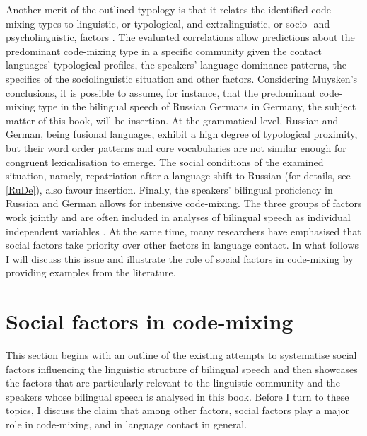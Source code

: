 Another merit of the outlined typology is that it relates the identified code-mixing types to linguistic, or typological, and extralinguistic, or socio- and psycholinguistic, factors \citep[][221--249]{muysken-bilingual-2000}. The evaluated correlations allow predictions about the predominant code-mixing type in a specific community given the contact languages' typological profiles, the speakers' language dominance patterns, the specifics of the sociolinguistic situation and other factors. Considering Muysken's conclusions, it is possible to assume, for instance, that the predominant code-mixing type in the bilingual speech of Russian Germans in Germany, the subject matter of this book, will be insertion. At the grammatical level, Russian and German, being fusional languages, exhibit a high degree of typological proximity, but their word order patterns and core vocabularies are not similar enough for congruent lexicalisation to emerge. The social conditions of the examined situation, namely, repatriation after a language shift to Russian (for details, see \ref{RuDe}), also favour insertion. Finally, the speakers' bilingual proficiency in Russian and German allows for intensive code-mixing. The three groups of factors work jointly and are often included in analyses of bilingual speech as individual independent variables \citep[cf.][]{muysken-etal96}. At the same time, many researchers have emphasised that social factors take priority over other factors in language contact. In what follows I will discuss this issue and illustrate the role of social factors in code-mixing by providing examples from the literature.

\section{Social factors in code-mixing}
This section begins with an outline of the existing attempts to systematise  social factors influencing the linguistic structure of bilingual speech and then showcases the factors that are particularly relevant to the linguistic community and the speakers whose bilingual speech is analysed in this book. Before I turn to these topics, I discuss the claim that among other factors, social factors play a major role in code-mixing, and in language contact in general.
 
